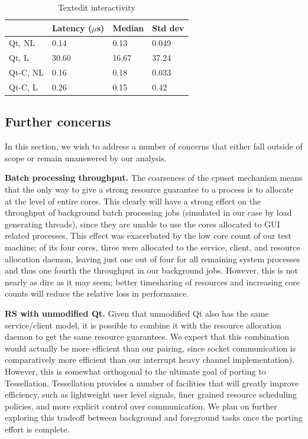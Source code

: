 \documentclass[letterpaper,twocolumn,11pt]{article}
\begin{document}
\begin{table}[htp]
\caption{Textedit interactivity}
\label{tab:textedit_table}
\centering
\begin{tabular}{|l | l | l | l |}
\hline
	&Latency ($\mu$s)	&Median	&Std dev\\ \hline
Qt, NL	&0.14	&0.13	&0.049\\
Qt, L	&30.60	&16.67	&37.24\\
Qt-C, NL	&0.16	&0.18	&0.033\\
Qt-C, L	&0.26	&0.15	&0.42\\
\hline
\end{tabular}
\end{table}

\subsection{Further concerns}

In this section, we wish to address a number of concerns that either fall outside of scope or remain unanswered by our analysis.

\textbf{Batch processing throughput.} The coarseness of the cpuset mechanism means that the only way to give a strong resource guarantee to a process is to allocate at the level of entire cores. This clearly will have a strong effect on the throughput of background batch processing jobs (simulated in our case by load generating threads), since they are unable to use the cores allocated to GUI related processes. This effect was exacerbated by the low core count of our test machine; of its four cores, three were allocated to the service, client, and resource allocation daemon, leaving just one out of four for all remaining system processes and thus one fourth the throughput in our background jobs. However, this is not nearly as dire as it may seem; better timesharing of resources and increasing core counts will reduce the relative loss in performance.

\textbf{RS with unmodified Qt.} Given that unmodified Qt also has the same service/client model, it is possible to combine it with the resource allocation daemon to get the same resource guarantees. We expect that this combination would actually be more efficient than our pairing, since socket communication is comparatively more efficient than our interrupt heavy channel implementation). However, this is somewhat orthogonal to the ultimate goal of porting to Tessellation. Tessellation provides a number of facilities that will greatly improve efficiency, such as lightweight user level signals, finer grained resource scheduling policies, and more explicit control over communication. We plan on further exploring this tradeoff between background and foreground tasks once the porting effort is complete.
\end{document}
